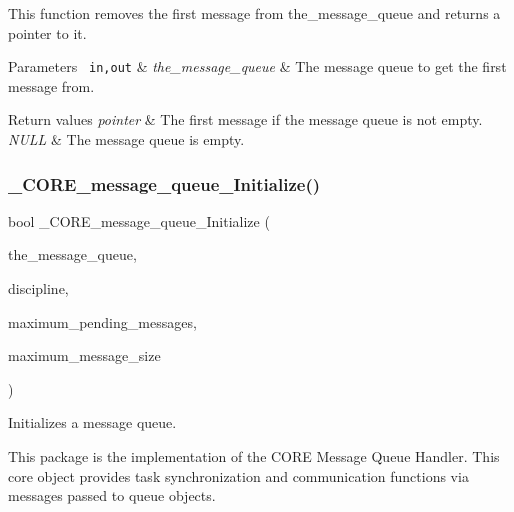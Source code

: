 This function removes the first message from the\+\_\+message\+\_\+queue and returns a pointer to it.


\begin{DoxyParams}[1]{Parameters}
\mbox{\texttt{ in,out}}  & {\em the\+\_\+message\+\_\+queue} & The message queue to get the first message from.\\
\hline
\end{DoxyParams}

\begin{DoxyRetVals}{Return values}
{\em pointer} & The first message if the message queue is not empty. \\
\hline
{\em N\+U\+LL} & The message queue is empty. \\
\hline
\end{DoxyRetVals}
\mbox{\label{group__RTEMSScoreMessageQueue_ga5358dca7fe0334940c9bfed58b4e520a}} 
\subsubsection{\texorpdfstring{\_CORE\_message\_queue\_Initialize()}{\_CORE\_message\_queue\_Initialize()}}
{\footnotesize\ttfamily bool \+\_\+\+C\+O\+R\+E\+\_\+message\+\_\+queue\+\_\+\+Initialize (\begin{DoxyParamCaption}\item[{\mbox{\hyperlink{structCORE__message__queue__Control}{C\+O\+R\+E\+\_\+message\+\_\+queue\+\_\+\+Control}} $\ast$}]{the\+\_\+message\+\_\+queue,  }\item[{\mbox{\hyperlink{group__RTEMSScoreMessageQueue_gaaeca88271cd9bc9ed7cf6996915481d0}{C\+O\+R\+E\+\_\+message\+\_\+queue\+\_\+\+Disciplines}}}]{discipline,  }\item[{uint32\+\_\+t}]{maximum\+\_\+pending\+\_\+messages,  }\item[{size\+\_\+t}]{maximum\+\_\+message\+\_\+size }\end{DoxyParamCaption})}



Initializes a message queue. 

This package is the implementation of the C\+O\+RE Message Queue Handler. This core object provides task synchronization and communication functions via messages passed to queue objects.

